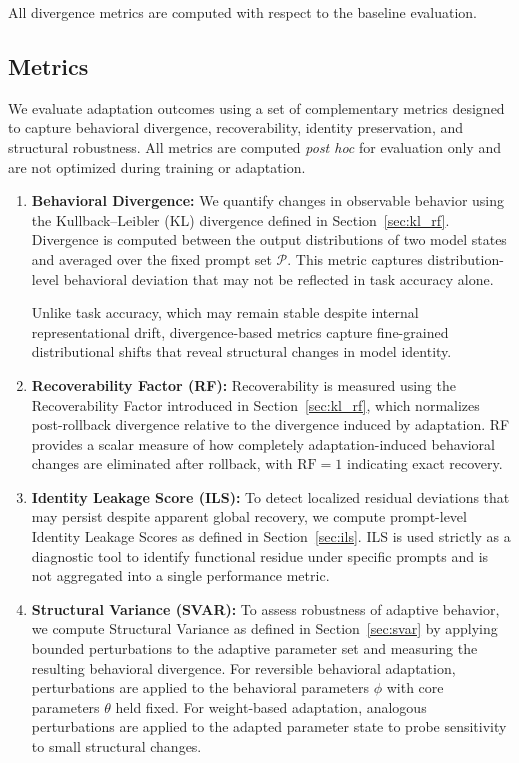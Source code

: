\documentclass{article}
\begin{document}
	All divergence metrics are computed with respect to the baseline evaluation.
	
	\subsection{Metrics}
	\label{sec:metrics}
	
	We evaluate adaptation outcomes using a set of complementary metrics designed to capture behavioral divergence, recoverability, identity preservation, and structural robustness. All metrics are computed \emph{post hoc} for evaluation only and are not optimized during training or adaptation.
	
	\begin{enumerate}
		\item \textbf{Behavioral Divergence:}
		We quantify changes in observable behavior using the Kullback--Leibler (KL) divergence defined in Section~\ref{sec:kl_rf}. Divergence is computed between the output distributions of two model states and averaged over the fixed prompt set $\mathcal{P}$. This metric captures distribution-level behavioral deviation that may not be reflected in task accuracy alone.
		
		Unlike task accuracy, which may remain stable despite internal representational drift, divergence-based metrics capture fine-grained distributional shifts that reveal structural changes in model identity.
		\item \textbf{Recoverability Factor (RF):}
		Recoverability is measured using the Recoverability Factor introduced in Section~\ref{sec:kl_rf}, which normalizes post-rollback divergence relative to the divergence induced by adaptation. RF provides a scalar measure of how completely adaptation-induced behavioral changes are eliminated after rollback, with $\mathrm{RF}=1$ indicating exact recovery.
		\item \textbf{Identity Leakage Score (ILS):}
		To detect localized residual deviations that may persist despite apparent global recovery, we compute prompt-level Identity Leakage Scores as defined in Section~\ref{sec:ils}. ILS is used strictly as a diagnostic tool to identify functional residue under specific prompts and is not aggregated into a single performance metric.
		\item \textbf{Structural Variance (SVAR):}
		To assess robustness of adaptive behavior, we compute Structural Variance as defined in Section~\ref{sec:svar} by applying bounded perturbations to the adaptive parameter set and measuring the resulting behavioral divergence. For reversible behavioral adaptation, perturbations are applied to the behavioral parameters $\phi$ with core parameters $\theta$ held fixed. For weight-based adaptation, analogous perturbations are applied to the adapted parameter state to probe sensitivity to small structural changes.
	\end{enumerate}
	
\end{document}
